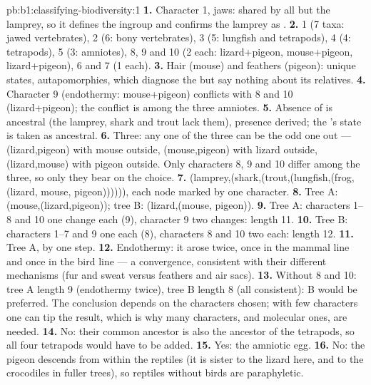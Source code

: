 \begin{solution}{pb:b1:classifying-biodiversity:1}
\textbf{1.} Character 1, jaws: shared by all but the lamprey, so it
defines the ingroup and confirms the lamprey as .
\textbf{2.} 1 (7 taxa: jawed vertebrates), 2 (6: bony vertebrates), 3
(5: lungfish and tetrapods), 4 (4: tetrapods), 5 (3: amniotes), 8, 9
and 10 (2 each: lizard+pigeon, mouse+pigeon, lizard+pigeon), 6 and 7
(1 each).
\textbf{3.} Hair (mouse) and feathers (pigeon): unique states,
autapomorphies, which diagnose the  but say nothing about its
relatives.
\textbf{4.} Character 9 (endothermy: mouse+pigeon) conflicts with 8
and 10 (lizard+pigeon); the conflict is among the three amniotes.
\textbf{5.} Absence of  is ancestral (the lamprey, shark and
trout lack them), presence derived; the 's state is taken as
ancestral.
\textbf{6.} Three: any one of the three can be the odd one out ---
(lizard,pigeon) with mouse outside, (mouse,pigeon) with lizard
outside, (lizard,mouse) with pigeon outside. Only characters 8, 9
and 10 differ among the three, so only they bear on the choice.
\textbf{7.} (lamprey,(shark,(trout,(lungfish,(frog,(lizard, mouse,
pigeon)))))), each node marked by one character.
\textbf{8.} Tree A: (mouse,(lizard,pigeon)); tree B: (lizard,(mouse,
pigeon)).
\textbf{9.} Tree A: characters 1--8 and 10 one change each (9), character
9 two changes: length \num{11}.
\textbf{10.} Tree B: characters 1--7 and 9 one each (8), characters 8 and
10 two each: length \num{12}.
\textbf{11.} Tree A, by one step.
\textbf{12.} Endothermy: it arose twice, once in the mammal line and
once in the bird line --- a convergence, consistent with their
different mechanisms (fur and sweat versus feathers and air sacs).
\textbf{13.} Without 8 and 10: tree A length 9 (endothermy twice), tree
B length 8 (all consistent): B would be preferred. The conclusion
depends on the characters chosen; with few characters one 
can tip the result, which is why many characters, and molecular
ones, are needed.
\textbf{14.} No: their common ancestor is also the ancestor of the
tetrapods, so all four tetrapods would have to be added.
\textbf{15.} Yes: the amniotic egg.
\textbf{16.} No: the pigeon descends from within the reptiles (it is
sister to the lizard here, and to the crocodiles in fuller trees), so
reptiles without birds are paraphyletic.

\end{solution}
